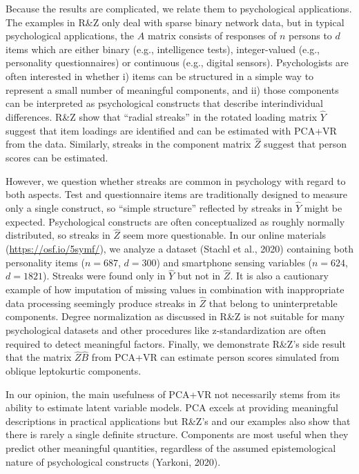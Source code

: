 \documentclass[
  jou,
  longtable,
  colorlinks=true,linkcolor=blue,citecolor=blue,urlcolor=blue]{apa7}
\begin{document}
Because the results are complicated, we relate them to psychological
applications. The examples in R\&Z only deal with sparse binary network
data, but in typical psychological applications, the \(A\) matrix
consists of responses of \(n\) persons to \(d\) items which are either
binary (e.g., intelligence tests), integer-valued (e.g., personality
questionnaires) or continuous (e.g., digital sensors). Psychologists are
often interested in whether i) items can be structured in a simple way
to represent a small number of meaningful components, and ii) those
components can be interpreted as psychological constructs that describe
interindividual differences. R\&Z show that ``radial streaks'' in the
rotated loading matrix \(\hat{Y}\) suggest that item loadings are
identified and can be estimated with PCA+VR from the data. Similarly,
streaks in the component matrix \(\hat{Z}\) suggest that person scores
can be estimated.

However, we question whether streaks are common in psychology with
regard to both aspects. Test and questionnaire items are traditionally
designed to measure only a single construct, so ``simple structure''
reflected by streaks in \(\hat{Y}\) might be expected. Psychological
constructs are often conceptualized as roughly normally distributed, so
streaks in \(\hat{Z}\) seem more questionable. In our online materials
(\url{https://osf.io/5symf/}), we analyze a dataset (Stachl et al.,
2020) containing both personality items (\(n =687\), \(d =300\)) and
smartphone sensing variables (\(n =624\), \(d =1821\)). Streaks were
found only in \(\hat{Y}\) but not in \(\hat{Z}\). It is also a
cautionary example of how imputation of missing values in combination
with inappropriate data processing seemingly produce streaks in
\(\hat{Z}\) that belong to uninterpretable components. Degree
normalization as discussed in R\&Z is not suitable for many
psychological datasets and other procedures like z-standardization are
often required to detect meaningful factors. Finally, we demonstrate
R\&Z's side result that the matrix \(\hat{Z}\hat{B}\) from PCA+VR can
estimate person scores simulated from oblique leptokurtic components.

In our opinion, the main usefulness of PCA+VR not necessarily stems from
its ability to estimate latent variable models. PCA excels at providing
meaningful descriptions in practical applications but R\&Z's and our
examples also show that there is rarely a single definite structure.
Components are most useful when they predict other meaningful
quantities, regardless of the assumed epistemological nature of
psychological constructs (Yarkoni, 2020).
\end{document}
